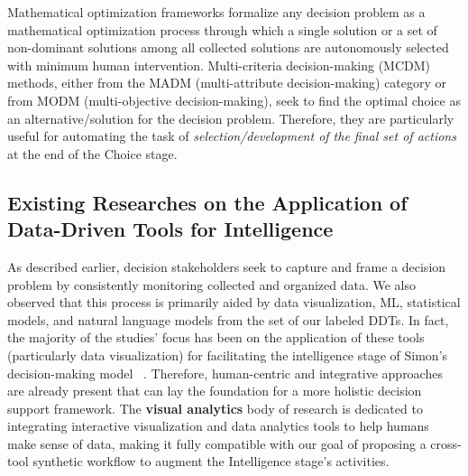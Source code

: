 \documentclass{sfuthesis}
\begin{document}
Mathematical optimization frameworks formalize any decision problem as a mathematical optimization process through which a single solution or a set of non-dominant solutions among all collected solutions are autonomously selected with minimum human intervention. Multi-criteria decision-making (MCDM) methods, either from the MADM (multi-attribute decision-making) category or from MODM (multi-objective decision-making), seek to find the optimal choice as an alternative/solution for the decision problem. Therefore, they are particularly useful for automating the task of \textit{selection/development of the final set of actions} at the end of the Choice stage.

\subsection{Existing Researches on the Application of Data-Driven Tools for Intelligence} \label{ExistingResearchIntelligence}
As described earlier, decision stakeholders seek to capture and frame a decision problem by consistently monitoring collected and organized data. We also observed that this process is primarily aided by data visualization, ML, statistical models, and natural language models from the set of our labeled DDTs. In fact, the majority of the studies’ focus has been on the application of these tools (particularly data visualization) for facilitating the intelligence stage of Simon’s decision-making model ~\cite{dimara_critical_2022}. Therefore, human-centric and integrative approaches are already present that can lay the foundation for a more holistic decision support framework. The \textbf{visual analytics} body of research is dedicated to integrating interactive visualization and data analytics tools to help humans make sense of data, making it fully compatible with our goal of proposing a cross-tool synthetic workflow to augment the Intelligence stage’s activities.
\end{document}
